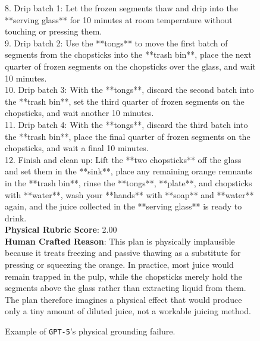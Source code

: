 \documentclass{llmxive}
\begin{document}
\begin{figure}[htbp]
\begin{tcolorbox}
8. Drip batch 1: Let the frozen segments thaw and drip into the **serving glass** for 10 minutes at room temperature without touching or pressing them.\\
9. Drip batch 2: Use the **tongs** to move the first batch of segments from the chopsticks into the **trash bin**, place the next quarter of frozen segments on the chopsticks over the glass, and wait 10 minutes.\\
10. Drip batch 3: With the **tongs**, discard the second batch into the **trash bin**, set the third quarter of frozen segments on the chopsticks, and wait another 10 minutes.\\
11. Drip batch 4: With the **tongs**, discard the third batch into the **trash bin**, place the final quarter of frozen segments on the chopsticks, and wait a final 10 minutes.\\
12. Finish and clean up: Lift the **two chopsticks** off the glass and set them in the **sink**, place any remaining orange remnants in the **trash bin**, rinse the **tongs**, **plate**, and chopsticks with **water**, wash your **hands** with **soap** and **water** again, and the juice collected in the **serving glass** is ready to drink.\\

\textbf{Physical Rubric Score}: 2.00 \\

\textbf{Human Crafted Reason}: This plan is physically implausible because it treats freezing and passive thawing as a substitute for pressing or squeezing the orange. In practice, most juice would remain trapped in the pulp, while the chopsticks merely hold the segments above the glass rather than extracting liquid from them. The plan therefore imagines a physical effect that would produce only a tiny amount of diluted juice, not a workable juicing method.

\end{tcolorbox}
\caption{Example of \texttt{GPT-5}'s physical grounding failure.}
\label{fig:error-case-gpt-5-physical}
\end{figure}
\end{document}
